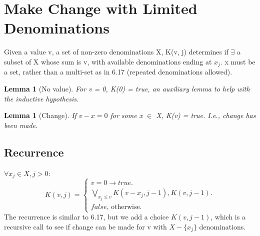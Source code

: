 \documentclass{article}
\newtheorem{lemma}[theorem]{Lemma}
\begin{document}
	
\section{Make Change with Limited Denominations}
Given a value v, a set of non-zero denominations X, K(v, j) determines if $\exists$ a subset of X whose sum is v, with available denominations ending at $x_j$. x must be a set, rather than a multi-set as in 6.17 (repeated denominations allowed).

\begin{lemma} [No value]
\label{bc1}	
For v = 0, K(0) = true, an auxiliary lemma to help with the inductive hypothesis.
\end{lemma}

\begin{lemma} [Change]
\label{bc2}	
If $v - x = 0$ for some x $\in$ X, K(v) = true. I.e., change has been made.
\end{lemma}

\subsection{Recurrence}
$\forall x_j \in X, j>0$:\\
\begin{equation}
K(v,j)=			
\begin{cases}
v = 0 \to true.\\	
\underset{x_j \leq v}{\bigvee} K(v-x_j, j-1), K(v, j-1).\\
false \text{, otherwise.}
\end{cases}
\end{equation}
The recurrence is similar to 6.17, but we add a choice $K(v,j-1)$, which is a recursive call to see if change can be made for v with $X - \{x_j\}$ denominations.
\end{document}
